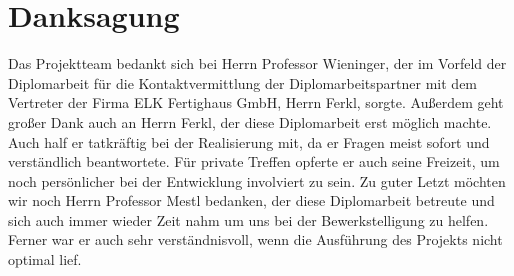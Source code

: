 \section{Danksagung}
Das Projektteam bedankt sich bei Herrn Professor Wieninger, der im Vorfeld der Diplomarbeit für die Kontaktvermittlung der Diplomarbeitspartner mit dem Vertreter der Firma ELK Fertighaus GmbH, Herrn Ferkl, sorgte. Außerdem geht großer Dank auch an Herrn Ferkl, der diese Diplomarbeit erst möglich machte. Auch half er tatkräftig bei der Realisierung mit, da er Fragen meist sofort und verständlich beantwortete. Für private Treffen opferte er auch seine Freizeit, um noch persönlicher bei der Entwicklung involviert zu sein. Zu guter Letzt möchten wir noch Herrn Professor Mestl bedanken, der diese Diplomarbeit betreute und sich auch immer wieder Zeit nahm um uns bei der Bewerkstelligung zu helfen. Ferner war er auch sehr verständnisvoll, wenn die Ausführung des Projekts nicht optimal lief.

